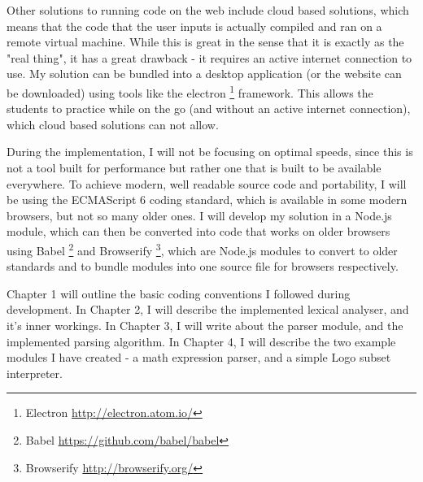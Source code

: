 Other solutions to running code on the web include cloud based solutions, which means that the code that the user inputs is actually compiled and ran on a remote virtual machine. While this is great in the sense that it is exactly as the "real thing", it has a great drawback - it requires an active internet connection to use. My solution can be bundled into a desktop application (or the website can be downloaded) using tools like the electron \footnote{Electron \url{http://electron.atom.io/}} framework. This allows the students to practice while on the go (and without an active internet connection), which cloud based solutions can not allow.

During the implementation, I will not be focusing on optimal speeds, since this is not a tool built for performance but rather one that is built to be available everywhere. To achieve modern, well readable source code and portability, I will be using the ECMAScript 6 coding standard, which is available in some modern browsers, but not so many older ones. I will develop my solution in a Node.js module, which can then be converted into code that works on older browsers using Babel \footnote{Babel \url{https://github.com/babel/babel}} and Browserify \footnote{Browserify \url{http://browserify.org/}}, which are Node.js modules to convert to older standards and to bundle modules into one source file for browsers respectively.

Chapter 1 will outline the basic coding conventions I followed during development. In Chapter 2, I will describe the implemented lexical analyser, and it's inner workings. In Chapter 3, I will write about the parser module, and the implemented parsing algorithm. In Chapter 4, I will describe the two example modules I have created - a math expression parser, and a simple Logo subset interpreter.
